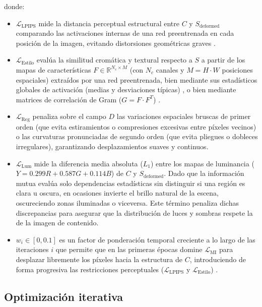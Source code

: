\documentclass[a4paper]{article}
\begin{document}
\noindent donde:
\begin{itemize}
    \item $\mathcal{L}_{\text{LPIPS}}$ mide la distancia perceptual estructural entre $C$ y $S_{\text{deformed}}$ comparando las activaciones internas de una red preentrenada en cada posición de la imagen, evitando distorsiones geométricas graves \cite{zhang2018unreasonable}.
    \item $\mathcal{L}_{\text{Estilo}}$ evalúa la similitud cromática y textural respecto a $S$ a partir de los mapas de características $F \in \mathbb{R}^{N_c \times M}$ (con $N_c$ canales y $M = H \cdot W$ posiciones espaciales) extraídos por una red preentrenada, bien mediante sus estadísticos globales de activación (medias y desviaciones típicas) \cite{huang2017arbitrary}, o bien mediante matrices de correlación de Gram ($G = F \cdot F^T$) \cite{gatys2015neural}.
    \item $\mathcal{L}_{\text{Reg}}$ penaliza sobre el campo $D$ las variaciones espaciales bruscas de primer orden (que evita estiramientos o compresiones excesivas entre píxeles vecinos) o las curvaturas pronunciadas de segundo orden (que evita pliegues o dobleces irregulares), garantizando desplazamientos suaves y continuos.
    \item $\mathcal{L}_{\text{Lum}}$ mide la diferencia media absoluta ($L_1$) entre los mapas de luminancia ($Y = 0.299R + 0.587G + 0.114B$) \cite{itur1995bt601} de $C$ y $S_{\text{deformed}}$. Dado que la información mutua evalúa solo dependencias estadísticas sin distinguir si una región es clara u oscura, en ocasiones invierte el brillo natural de la escena, oscureciendo zonas iluminadas o viceversa. Este término penaliza dichas discrepancias para asegurar que la distribución de luces y sombras respete la de la imagen de contenido.
    \item $w_i \in [0, 0.1]$ es un factor de ponderación temporal creciente a lo largo de las iteraciones $i$ que permite que en las primeras épocas domine $\mathcal{L}_{\text{MI}}$ para desplazar libremente los píxeles hacia la estructura de $C$, introduciendo de forma progresiva las restricciones perceptuales ($\mathcal{L}_{\text{LPIPS}}$ y $\mathcal{L}_{\text{Estilo}}$) \cite{zamzam2025pixelshuffler}.
\end{itemize}

\subsection{Optimización iterativa}
\end{document}

